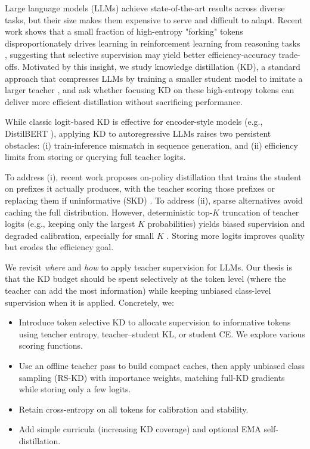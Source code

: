 \documentclass[11pt]{article}
\begin{document}
Large language models (LLMs) achieve state-of-the-art results across diverse tasks, but their size makes them expensive to serve and difficult to adapt.
Recent work shows that a small fraction of high-entropy "forking" tokens disproportionately drives learning in reinforcement learning from reasoning tasks \citep{wang2025highentropy}, suggesting that selective supervision may yield better efficiency-accuracy trade-offs.
Motivated by this insight, we study knowledge distillation (KD), a standard approach that compresses LLMs by training a smaller student model to imitate a larger teacher \citep{hinton2015distillation}, and ask whether focusing KD on these high-entropy tokens can deliver more efficient distillation without sacrificing performance.

While classic logit-based KD is effective for encoder-style models (e.g., DistilBERT \citep{sanh2019distilbert}), applying KD to autoregressive LLMs raises two persistent obstacles: (i) train-inference mismatch in sequence generation, and (ii) efficiency limits from storing or querying full teacher logits.

To address (i), recent work proposes on-policy distillation that trains the student on prefixes it actually produces, with the teacher scoring those prefixes \citep{agarwal2024gkd} or replacing them if uninformative (SKD) \citep{xu2024speculative}.
To address (ii), sparse alternatives avoid caching the full distribution. However, deterministic top-$K$ truncation of teacher logits (e.g., keeping only the largest $K$ probabilities) yields biased supervision and degraded calibration, especially for small $K$ \citep{anshumann2025sparse,shum2024first}.
Storing more logits improves quality but erodes the efficiency goal.

We revisit \emph{where} and \emph{how} to apply teacher supervision for LLMs.
Our thesis is that the KD budget should be spent selectively at the token level (where the teacher can add the most information) while keeping unbiased class-level supervision when it is applied.
Concretely, we:

\begin{itemize}
	\item Introduce token selective KD to allocate supervision to informative tokens using teacher entropy, teacher--student KL, or student CE. We explore various scoring functions.
	\item Use an offline teacher pass to build compact caches, then apply unbiased class sampling (RS-KD) with importance weights, matching full-KD gradients while storing only a few logits.
	\item Retain cross-entropy on all tokens for calibration and stability.
	\item Add simple curricula (increasing KD coverage) and optional EMA self-distillation.
\end{itemize}
\end{document}
